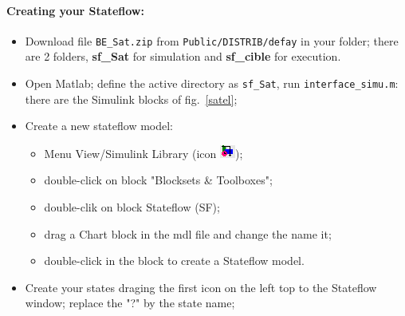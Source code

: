 \documentclass[a4paper]{article}
\begin{document}
\paragraph{Creating your Stateflow:}
\begin{itemize}
\item Download file {\tt BE\_Sat.zip} from {\tt Public/DISTRIB/defay} in your folder;
	there are 2 folders, {\bf sf\_Sat} for simulation and {\bf sf\_cible} for execution. 
\item Open Matlab; define the active directory as {\tt sf\_Sat}, run {\tt interface\_simu.m}:
	there are the Simulink blocks of fig.~\ref{satel};%
\item Create a new stateflow model:
	\begin{itemize}
	\item Menu View/Simulink Library (icon \includegraphics[width=.5cm]{iconLib});
	\item double-click on block "Blocksets \& Toolboxes";
	\item double-clik on block Stateflow (SF); 
	\item drag a Chart block in the mdl file and change the name it; 
	\item double-click in the block to create a Stateflow model.
	\end{itemize}
\item Create your states draging the first icon on the left top to the Stateflow window; 
	replace the "?" by the state name;
\end{itemize}
\end{document}
